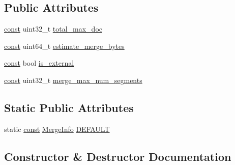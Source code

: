 \subsection*{Public Attributes}
\begin{DoxyCompactItemize}
\item 
\mbox{\hyperlink{ZlibCrc32_8h_a2c212835823e3c54a8ab6d95c652660e}{const}} uint32\+\_\+t \mbox{\hyperlink{classlucene_1_1core_1_1store_1_1MergeInfo_a3303509ceef1e9e04bb3e35cf6975091}{total\+\_\+max\+\_\+doc}}
\item 
\mbox{\hyperlink{ZlibCrc32_8h_a2c212835823e3c54a8ab6d95c652660e}{const}} uint64\+\_\+t \mbox{\hyperlink{classlucene_1_1core_1_1store_1_1MergeInfo_a9f174ed5a8f232b8bc250d7be60fd274}{estimate\+\_\+merge\+\_\+bytes}}
\item 
\mbox{\hyperlink{ZlibCrc32_8h_a2c212835823e3c54a8ab6d95c652660e}{const}} bool \mbox{\hyperlink{classlucene_1_1core_1_1store_1_1MergeInfo_a764f1ebeb8edd749c37939e2b88338d3}{is\+\_\+external}}
\item 
\mbox{\hyperlink{ZlibCrc32_8h_a2c212835823e3c54a8ab6d95c652660e}{const}} uint32\+\_\+t \mbox{\hyperlink{classlucene_1_1core_1_1store_1_1MergeInfo_ad54f52a5943e82fb4582c5ae54637537}{merge\+\_\+max\+\_\+num\+\_\+segments}}
\end{DoxyCompactItemize}
\subsection*{Static Public Attributes}
\begin{DoxyCompactItemize}
\item 
static \mbox{\hyperlink{ZlibCrc32_8h_a2c212835823e3c54a8ab6d95c652660e}{const}} \mbox{\hyperlink{classlucene_1_1core_1_1store_1_1MergeInfo}{Merge\+Info}} \mbox{\hyperlink{classlucene_1_1core_1_1store_1_1MergeInfo_a8c15f5ef4010990dfa3715b28fa75b41}{D\+E\+F\+A\+U\+LT}}
\end{DoxyCompactItemize}


\subsection{Constructor \& Destructor Documentation}
\mbox{\label{classlucene_1_1core_1_1store_1_1MergeInfo_a3618d38701960ebb65c1e78b5cca0629}} 
